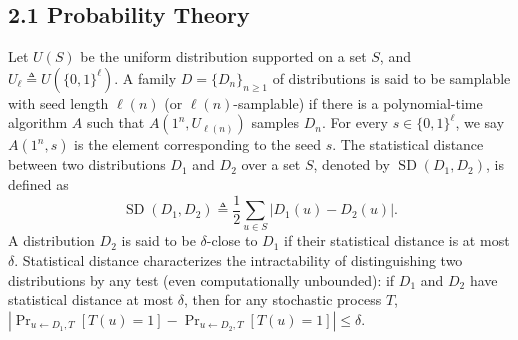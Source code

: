 \documentclass[10pt,a4paper]{article}
\begin{document}
\subsection*{2.1 Probability Theory}
Let $U(S)$ be the uniform distribution supported on a set $S$, and $U_\ell\triangleq U(\{0,1\}^\ell)$. A family $D=\{D_n\}_{n\ge1}$ of distributions is said to be samplable with seed length $\ell(n)$ (or $\ell(n)$-samplable) if there is a polynomial-time algorithm $A$ such that $A(1^n,U_{\ell(n)})$ samples $D_n$. For every $s\in\{0,1\}^\ell$, we say $A(1^n,s)$ is the element corresponding to the seed $s$.
The statistical distance between two distributions $D_1$ and $D_2$ over a set $S$, denoted by $\operatorname{SD}(D_1,D_2)$, is defined as
\[\operatorname{SD}(D_1,D_2)\triangleq\frac12\sum_{u\in S}|D_1(u)-D_2(u)|.\]
A distribution $D_2$ is said to be $\delta$-close to $D_1$ if their statistical distance is at most $\delta$. Statistical distance characterizes the intractability of distinguishing two distributions by any test (even computationally unbounded): if $D_1$ and $D_2$ have statistical distance at most $\delta$, then for any stochastic process $T$, $|\Pr_{u\leftarrow D_1,T}[T(u)=1]-\Pr_{u\leftarrow D_2,T}[T(u)=1]|\le\delta$.
\end{document}
